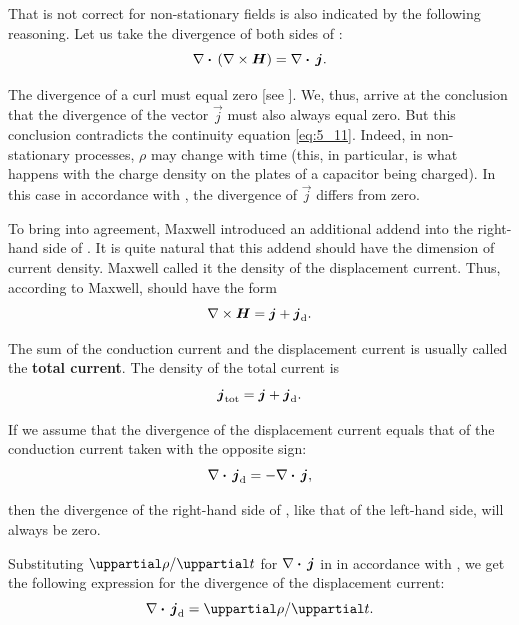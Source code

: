 That  is not correct for non-stationary fields is also indicated by the following reasoning.
Let us take the divergence of both sides of :
\begin{equation*}
    \nabla\boldsymbol{\cdot}\,(\nabla\times\boldsymbol{H}) = \nabla\boldsymbol{\cdot}\,\boldsymbol{j}.
\end{equation*}

\noindent
The divergence of a curl must equal zero [see ].
We, thus, arrive at the conclusion that the divergence of the vector $\vec{j}$ must also always equal zero.
But this conclusion contradicts the continuity equation \eqref{eq:5_11}.
Indeed, in non-stationary processes, $\rho$ may change with time (this, in particular, is what happens with the charge density on the plates of a capacitor being charged).
In this case in accordance with , the divergence of $\vec{j}$ differs from zero.

To bring  into agreement, Maxwell introduced an additional addend into the right-hand side of .
It is quite natural that this addend should have the dimension of current density.
Maxwell called it the density of the displacement current.
Thus, according to Maxwell,  should have the
form
\begin{equation}\label{eq:9_8}
    \nabla\times\boldsymbol{H} = \boldsymbol{j} + \boldsymbol{j}_{\text{d}}.
\end{equation}

The sum of the conduction current and the displacement current is usually called the \textbf{total current}.
The density of the total current is
\begin{equation}\label{eq:9_9}
    \boldsymbol{j}_{\text{tot}} = \boldsymbol{j} + \boldsymbol{j}_{\text{d}}.
\end{equation}

If we assume that the divergence of the displacement current equals that of the conduction current taken with the opposite sign:
\begin{equation}\label{eq:9_10}
    \nabla\boldsymbol{\cdot}\,\boldsymbol{j}_{\text{d}} = - \nabla\boldsymbol{\cdot}\,\boldsymbol{j},
\end{equation}

\noindent
then the divergence of the right-hand side of , like that of the left-hand side, will always be zero.

Substituting $\diffinpartial{\rho}{t}$ for $\nabla\boldsymbol{\cdot}\,\boldsymbol{j}$ in  in accordance with , we get the following expression for the divergence of the displacement current:
\begin{equation}\label{eq:9_11}
    \divop{\ab{\vec{j}}{d}} = \diffinpartial{\rho}{t}.
\end{equation}

